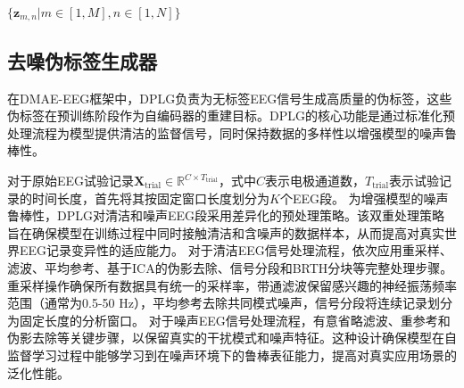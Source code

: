 \begin{algorithm}[htbp]
\caption{基于图的大脑区域池化}
\label{alg:graph_pooling}





\Return $\{\mathbf{z}_{m,n} | m \in [1,M], n \in [1,N]\}$
\end{algorithm}



\subsection{去噪伪标签生成器}
在DMAE-EEG框架中，DPLG负责为无标签EEG信号生成高质量的伪标签，这些伪标签在预训练阶段作为自编码器的重建目标。DPLG的核心功能是通过标准化预处理流程为模型提供清洁的监督信号，同时保持数据的多样性以增强模型的噪声鲁棒性。

对于原始EEG试验记录$\mathbf{X}_{\text{trial}} \in \mathbb{R}^{C \times T_{\text{trial}}}$，式中$C$表示电极通道数，$T_{\text{trial}}$表示试验记录的时间长度，首先将其按固定窗口长度划分为$K$个EEG段。
为增强模型的噪声鲁棒性，DPLG对清洁和噪声EEG段采用差异化的预处理策略。该双重处理策略旨在确保模型在训练过程中同时接触清洁和含噪声的数据样本，从而提高对真实世界EEG记录变异性的适应能力。
对于清洁EEG信号处理流程，依次应用重采样、滤波、平均参考、基于ICA的伪影去除、信号分段和BRTH分块等完整处理步骤。重采样操作确保所有数据具有统一的采样率，带通滤波保留感兴趣的神经振荡频率范围（通常为0.5-50 Hz），平均参考去除共同模式噪声，信号分段将连续记录划分为固定长度的分析窗口。
对于噪声EEG信号处理流程，有意省略滤波、重参考和伪影去除等关键步骤，以保留真实的干扰模式和噪声特征。这种设计确保模型在自监督学习过程中能够学习到在噪声环境下的鲁棒表征能力，提高对真实应用场景的泛化性能。


